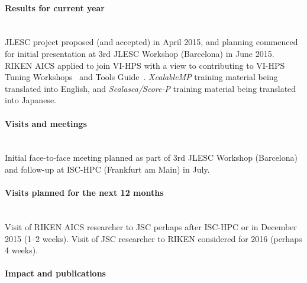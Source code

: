 \begin{refsection}
\paragraph{Results for current year}~\\


JLESC project proposed (and accepted) in April 2015, and planning
commenced for initial presentation at 3rd JLESC Workshop (Barcelona) in
June 2015.  RIKEN AICS applied to join VI-HPS with a view
to contributing to VI-HPS Tuning Workshops~\cite{VI-HPS-TWS} and Tools Guide~\cite{VI-HPS_ToolsGuide}.
\textit{XcalableMP} training material being translated into English, and
\textit{Scalasca/Score-P} training material being translated into Japanese.


\paragraph{Visits and meetings}~\\


Initial face-to-face meeting planned as part of 3rd JLESC Workshop (Barcelona) and
follow-up at ISC-HPC (Frankfurt am Main) in July.

\paragraph{Visits planned for the next 12 months}~\\


Visit of RIKEN AICS researcher to JSC perhaps after ISC-HPC or in December 2015 (1--2 weeks).
Visit of JSC researcher to RIKEN considered for 2016 (perhaps 4 weeks).

\paragraph{Impact and publications}~\\

\printbibliography[heading=none,keyword=own]


\end{refsection}

